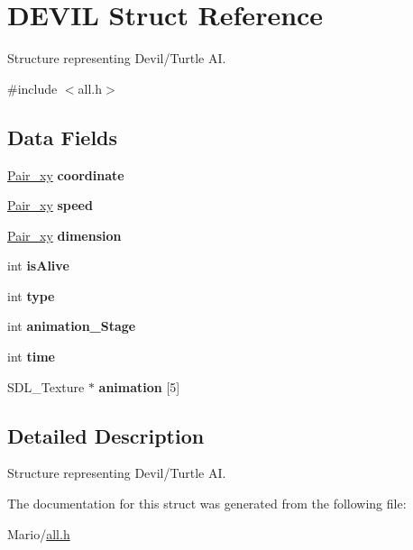 \hypertarget{struct_d_e_v_i_l}{}\section{D\+E\+V\+IL Struct Reference}
\label{struct_d_e_v_i_l}


Structure representing Devil/\+Turtle AI.  




{\ttfamily \#include $<$all.\+h$>$}

\subsection*{Data Fields}
\begin{DoxyCompactItemize}
\item 
\mbox{\label{struct_d_e_v_i_l_a6cf77a9254df5cfd669084e0a97d9711}} 
\mbox{\hyperlink{all_8h_a9a35f73dcc6cf9a466e6542847bd8882}{Pair\+\_\+xy}} {\bfseries coordinate}
\item 
\mbox{\label{struct_d_e_v_i_l_a17e25b2ef4c597ac58da845ec3bce5c6}} 
\mbox{\hyperlink{all_8h_a9a35f73dcc6cf9a466e6542847bd8882}{Pair\+\_\+xy}} {\bfseries speed}
\item 
\mbox{\label{struct_d_e_v_i_l_a0da7d680eb31a67eac3371518ae0a6cb}} 
\mbox{\hyperlink{all_8h_a9a35f73dcc6cf9a466e6542847bd8882}{Pair\+\_\+xy}} {\bfseries dimension}
\item 
\mbox{\label{struct_d_e_v_i_l_a116ae74d5b3df6d48cdb0f3a6bb36a07}} 
int {\bfseries is\+Alive}
\item 
\mbox{\label{struct_d_e_v_i_l_ac765329451135abec74c45e1897abf26}} 
int {\bfseries type}
\item 
\mbox{\label{struct_d_e_v_i_l_a6118bdc05fce34a198c8e8d332708235}} 
int {\bfseries animation\+\_\+\+Stage}
\item 
\mbox{\label{struct_d_e_v_i_l_a42715f65f02da52edc5b22021d8ae670}} 
int {\bfseries time}
\item 
\mbox{\label{struct_d_e_v_i_l_a9426997813cf55c63dc4fee2afb2ef74}} 
S\+D\+L\+\_\+\+Texture $\ast$ {\bfseries animation} \mbox{[}5\mbox{]}
\end{DoxyCompactItemize}


\subsection{Detailed Description}
Structure representing Devil/\+Turtle AI. 

The documentation for this struct was generated from the following file\+:\begin{DoxyCompactItemize}
\item 
Mario/\mbox{\hyperlink{all_8h}{all.\+h}}\end{DoxyCompactItemize}
